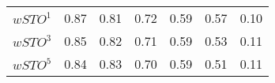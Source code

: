 \documentclass[onecolumn]{article} %
\begin{document}
\begin{table}[ht]
\begin{tabular}{lllllll}
\(\displaystyle wSTO^1 \) &   {\color[HTML]{00D768} 0.87} & {\color[HTML]{EF2A00} 0.81} & {\color[HTML]{0051D7} 0.72} & {\color[HTML]{6200D7} 0.59} & {\color{orange} 0.57} & {\color[HTML]{9B9B9B} 0.10} \\
\(\displaystyle wSTO^3 \) &   {\color[HTML]{00D768} 0.85} & {\color[HTML]{EF2A00} 0.82} & {\color[HTML]{0051D7} 0.71} & {\color[HTML]{6200D7} 0.59} & {\color{orange} 0.53} & {\color[HTML]{9B9B9B} 0.11} \\
\(\displaystyle wSTO^5 \) &   {\color[HTML]{00D768} 0.84} & {\color[HTML]{EF2A00} 0.83} & {\color[HTML]{0051D7} 0.70} & {\color[HTML]{6200D7} 0.59} & {\color{orange} 0.51} & {\color[HTML]{9B9B9B} 0.11} \\
\end{tabular}
\end{table}
\end{document}
